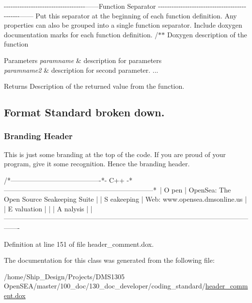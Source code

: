 -\/-\/-\/-\/-\/-\/-\/-\/-\/-\/-\/-\/-\/-\/-\/-\/-\/-\/-\/-\/-\/-\/-\/-\/-\/-\/-\/-\/-\/-\/-\/-\/-\/-\/-\/-\/------Function Separator -\/-\/-\/-\/-\/-\/-\/-\/-\/-\/-\/-\/-\/-\/-\/-\/-\/-\/-\/-\/-\/-\/-\/-\/-\/-\/-\/-\/-\/-\/-\/-\/-\/-\/-\/-\/-\/-\/-\/-\/-\/-\/-\/-\/-\/-\/------ Put this separator at the beginning of each function definition. Any properties can also be grouped into a single function separator. Include doxygen documentation marks for each function definition. /$\ast$$\ast$ Doxygen description of the function 
\begin{DoxyParams}{Parameters}
{\em paramname} & description for parameters \\
\hline
{\em paramname2} & description for second parameter. ... \\
\hline
\end{DoxyParams}
\begin{DoxyReturn}{Returns}
Description of the returned value from the function.
\end{DoxyReturn}
\hypertarget{class_test_doxydown}{}\subsection{Format Standard broken down.}\label{class_test_doxydown}
\hypertarget{class_test_brandheader}{}\subsubsection{Branding Header}\label{class_test_brandheader}
This is just some branding at the top of the code. If you are proud of your program, give it some recognition. Hence the branding header. \begin{DoxyVerb}  /*----------------------------------------*- C++ -*------------------------------------------------------------------*\
  | O pen         | OpenSea: The Open Source Seakeeping Suite                                                           |
  | S eakeeping   | Web:     www.opensea.dmsonline.us                                                                   |
  | E valuation   |                                                                                                     |
  | A nalysis     |                                                                                                     |
  \*------------------------------------------------------------------------------------------------------------------- \end{DoxyVerb}
 

Definition at line 151 of file header\-\_\-comment.\-dox.



The documentation for this class was generated from the following file\-:\begin{DoxyCompactItemize}
\item 
/home/\-Ship\-\_\-\-Design/\-Projects/\-D\-M\-S1305 Open\-S\-E\-A/master/100\-\_\-doc/130\-\_\-doc\-\_\-developer/coding\-\_\-standard/\hyperlink{header__comment_8dox}{header\-\_\-comment.\-dox}\end{DoxyCompactItemize}
